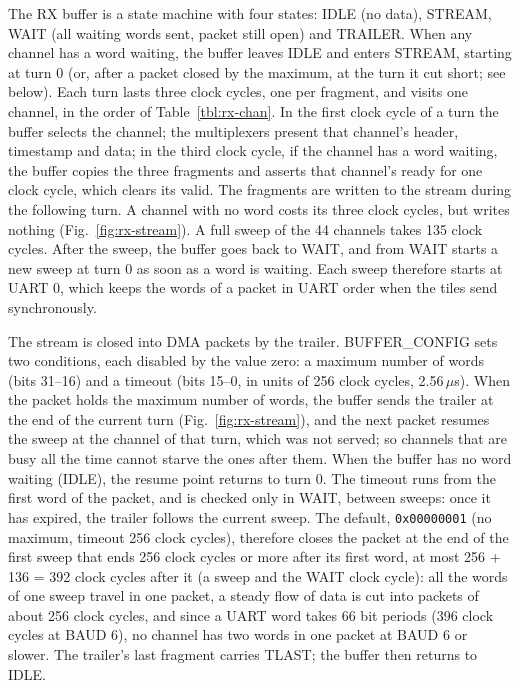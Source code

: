 \documentclass[12pt]{article}
\newcommand{\hex}[1]{\texttt{0x#1}}
\begin{document}
The RX buffer is a state machine with four states: IDLE (no data), STREAM, WAIT (all waiting words sent,
packet still open) and TRAILER.  When any channel has a word waiting, the buffer leaves IDLE and enters
STREAM, starting at turn 0 (or, after a packet closed by the maximum, at the turn it cut short; see
below).  Each turn lasts three clock cycles, one per fragment, and visits one channel, in
the order of Table~\ref{tbl:rx-chan}.  In the first clock cycle of a turn the buffer selects the channel; the
multiplexers present that channel's header, timestamp and data; in the third clock cycle, if the channel has
a word waiting, the buffer copies the three fragments and asserts that channel's ready for one clock cycle,
which clears its valid.  The fragments are written to the stream during the following turn.  A channel with
no word costs its three clock cycles, but writes nothing (Fig.~\ref{fig:rx-stream}).  A full sweep of the 44
channels takes 135 clock cycles.  After the sweep, the buffer goes back to WAIT, and from WAIT starts a new
sweep at turn 0 as soon as a word is waiting.  Each sweep therefore starts at UART 0, which keeps the words
of a packet in UART order when the tiles send synchronously.

The stream is closed into DMA packets by the trailer.  BUFFER\_CONFIG sets two conditions, each disabled by
the value zero: a maximum number of words (bits 31--16) and a timeout (bits 15--0, in units of 256 clock
cycles, 2.56\,$\mu$s).  When the packet holds the maximum number of words, the buffer sends the trailer at
the end of the current turn (Fig.~\ref{fig:rx-stream}), and the next packet resumes the sweep at the channel
of that turn, which was not served; so channels that are busy all the time cannot starve the ones after them.
When the buffer has no word waiting (IDLE), the resume point returns to turn 0.  The timeout runs from the first word of the packet,
and is checked only in WAIT, between sweeps: once it has expired, the trailer follows the current sweep.  The
default, \hex{00000001} (no maximum, timeout 256 clock cycles), therefore closes the packet at the end of the
first sweep that ends 256 clock cycles or more after its first word, at most 256 + 136 = 392 clock cycles
after it (a sweep and the WAIT clock cycle): all the words of one sweep travel in one packet, a steady flow of data is cut into packets of about
256 clock cycles, and since a UART word takes 66 bit periods (396 clock cycles at BAUD 6), no channel has two
words in one packet at BAUD 6 or slower.  The trailer's last fragment carries TLAST; the buffer then returns to IDLE.
\end{document}

